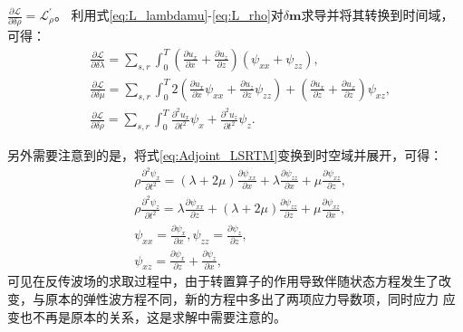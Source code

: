 $\frac{\partial\mathcal{L}}{\partial\delta\rho}=\mathcal{L}^{'}_{\rho}$。
利用式\eqref{eq:L_lambdamu}-\eqref{eq:L_rho}对$\delta\mathbf{m}$求导并将其转换到时间域，
可得：
\begin{equation}
\begin{split}
   & \frac{\partial\mathcal{L}}{\partial \delta\lambda}=\sum_{s,r}\int^T_{0}
	(\frac{\partial u_x}{\partial x}+\frac{\partial u_z}{\partial z})(\psi_{xx}+\psi_{zz}),\\
   & \frac{\partial\mathcal{L}}{\partial \delta\mu}=\sum_{s,r}\int^T_{0}
	2(\frac{\partial u_x}{\partial x}\psi_{xx}+\frac{\partial u_z}{\partial z}\psi_{zz})+
	(\frac{\partial u_x}{\partial z}+\frac{\partial u_x}{\partial z})\psi_{xz},\\
   & \frac{\partial\mathcal{L}}{\partial \delta\rho}=\sum_{s,r}\int^T_{0}
	\frac{\partial^2 u_x}{\partial t^2}\psi_x+\frac{\partial^2 u_z}{\partial t^2}\psi_{z}.
    \label{eq:Gradient_lambdamurho_LSRTM}
\end{split}
\end{equation}

另外需要注意到的是，将式\eqref{eq:Adjoint_LSRTM}变换到时空域并展开，可得：
\begin{equation}
\begin{split}
   & \rho\frac{\partial^2 \psi_{x}}{\partial t^2}=	(\lambda+2\mu)\frac{\partial \psi_{xx}}{\partial x}+
		\lambda\frac{\partial \psi_{zz}}{\partial x}+\mu\frac{\partial \psi_{xz}}{\partial z},\\
   & \rho\frac{\partial^2 \psi_{z}}{\partial t^2}=	\lambda\frac{\partial \psi_{xx}}{\partial z}+
		(\lambda+2\mu)\frac{\partial \psi_{zz}}{\partial z}+\mu\frac{\partial \psi_{xz}}{\partial x},\\
   & \psi_{xx}=\frac{\partial \psi_x}{\partial x}, \psi_{zz}=\frac{\partial \psi_z}{\partial z},\\
   & \psi_{xz}=\frac{\partial \psi_x}{\partial z} + \frac{\partial \psi_z}{\partial x},
    \label{eq:Time_Adjoint_WE_LSRTM}
\end{split}
\end{equation}
可见在反传波场的求取过程中，由于转置算子的作用导致伴随状态方程发生了改变，与原本的弹性波方程不同，新的方程中多出了两项应力导数项，同时应力
应变也不再是原本的关系，这是求解中需要注意的。
